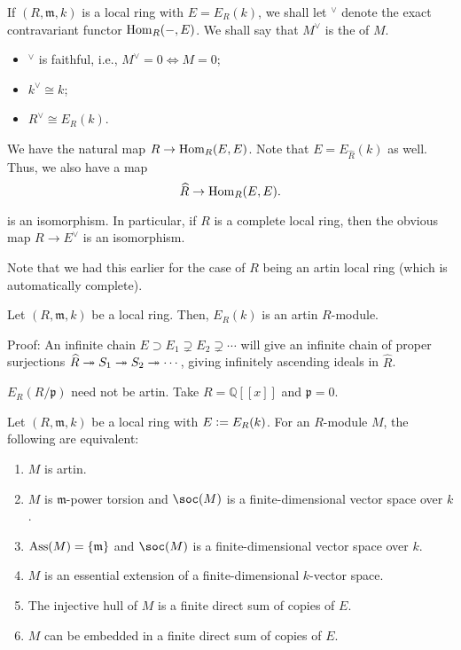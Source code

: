 \documentclass[12pt]{article}
\begin{document}
If $(R, \mathfrak{m}, k)$ is a local ring with $E = E_{R}(k)$, we shall let $^{\vee}$ denote the exact contravariant functor $\operatorname{Hom}_{R}(-, E)$. We shall say that $M^{\vee}$ is the  of $M$.
\begin{itemize}
	\item $^{\vee}$ is faithful, i.e., $M^{\vee} = 0 \Leftrightarrow M = 0$;
	\item $k^{\vee} \cong k$;
	\item $R^{\vee} \cong E_{R}(k)$.
\end{itemize}
We have the natural map $R \to \operatorname{Hom}_{R}(E, E)$. Note that $E = E_{\widehat{R}}(k)$ as well. Thus, we also have a map
\begin{equation} \label{eq:001}
	\widehat{R} \to \operatorname{Hom}_{R}(E, E).
\end{equation}

\begin{thm}
	 is an isomorphism. In particular, if $R$ is a complete local ring, then the obvious map $R \to E^{\vee}$ is an isomorphism.
\end{thm}
Note that we had this earlier for the case of $R$ being an artin local ring (which is automatically complete).

\begin{cor}
	Let $(R, \mathfrak{m}, k)$ be a local ring. Then, $E_{R}(k)$ is an artin $R$-module.
\end{cor}
Proof: An infinite chain $E \supset E_{1} \supsetneq E_{2} \supsetneq \cdots$ will give an infinite chain of proper surjections $\widehat{R} \twoheadrightarrow S_{1} \twoheadrightarrow S_{2} \twoheadrightarrow \cdots$, giving infinitely ascending ideals in $\widehat{R}$.

\begin{ex}
	$E_{R}(R/\mathfrak{p})$ need not be artin. Take $R = \mathbb{Q}[\![x]\!]$ and $\mathfrak{p} = 0$.
\end{ex}

\begin{thm}
	Let $(R, \mathfrak{m}, k)$ be a local ring with $E \vcentcolon= E_{R}(k)$. For an $R$-module $M$, the following are equivalent:
	\begin{enumerate}[label=(\alph*)]
		\item $M$ is artin.
		\item $M$ is $\mathfrak{m}$-power torsion and $\soc(M)$ is a finite-dimensional vector space over $k$.
		\item $\operatorname{Ass}(M) = \{\mathfrak{m}\}$ and $\soc(M)$ is a finite-dimensional vector space over $k$.
		\item $M$ is an essential extension of a finite-dimensional $k$-vector space.
		\item The injective hull of $M$ is a finite direct sum of copies of $E$.
		\item $M$ can be embedded in a finite direct sum of copies of $E$.
	\end{enumerate}
\end{thm}
\end{document}
